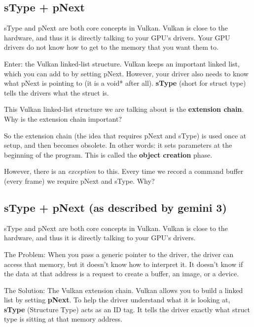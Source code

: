 \documentclass{article}
\begin{document}
\subsection*{sType + pNext}
\par sType and pNext are both core concepts in Vulkan. Vulkan is
close to the hardware, and thus it is directly talking to your GPU's
drivers. Your GPU drivers do not know how to get to the memory that
you want them to.

\par Enter: the Vulkan linked-list structure. Vulkan keeps an
important linked list, which you can add to by setting pNext.
However, your driver also needs to know what pNext is pointing to (it
is a void* after all). \textbf{sType} (short for struct type) tells
the drivers what the struct is.

\par This Vulkan linked-list structure we are talking about is the
\textbf{extension chain}. Why is the extension chain important?

\par So the extension chain (the idea that requires pNext and sType)
is used once at setup, and then becomes obsolete. In other words: it
sets parameters at the beginning of the program. This is called the
\textbf{object creation} phase.

\par However, there is an \textit{exception} to this. Every time we
record a command buffer (every frame) we require pNext and sType. Why?

\subsection*{sType + pNext (as described by gemini
3)} \par
sType and pNext are
both core concepts in Vulkan. Vulkan is close to the hardware, and
thus it is directly talking to your GPU's drivers.

\par The Problem: When you pass a generic pointer to the driver, the
driver can access that memory, but it doesn't know how to interpret
it. It doesn't know if the data at that address is a request to
create a buffer, an image, or a device.

\par The Solution: The Vulkan extension chain. Vulkan allows you to
build a linked list by setting \textbf{pNext}. To help the driver
understand what it is looking at, \textbf{sType} (Structure Type)
acts as an ID tag. It tells the driver exactly what struct type is
sitting at that memory address.
\end{document}
